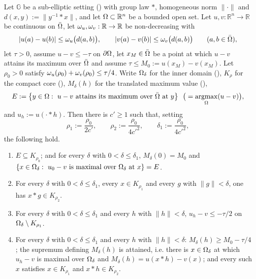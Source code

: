 \begin{lemma}
Let $\mathbb G$ be a sub-elliptic setting () with group law $*$,
homogeneous norm $\|\cdot\|$ and $d(x,y):=\|y^{-1}*x\|$, and let
$\Omega\subset\mathbb R^{n}$ be a bounded open set. Let $u,v:\mathbb R^{n}\to\mathbb R$ be
continuous on $\bar{\Omega}$, let $\omega_u,\omega_v:\mathbb R\to\mathbb R$ be non-decreasing with
\[
 |u(a)-u(b)|\le\omega_u\big(d(a,b)\big),\qquad |v(a)-v(b)|\le\omega_v\big(d(a,b)\big)
 \qquad(a,b\in\bar{\Omega}),
\]
let $\tau>0$, assume $u-v\le-\tau$ on $\partial\Omega$, let $x_M\in\bar{\Omega}$ be a point at which
$u-v$ attains its maximum over $\bar{\Omega}$ and assume $\tau\le M_0:=u(x_M)-v(x_M)$. Let
$\rho_0>0$ satisfy $\omega_u(\rho_0)+\omega_v(\rho_0)\le\tau/4$. Write $\Omega_\delta$ for the inner
domain (), $K_\rho$ for the compact core
(), $M_\delta(h)$ for the translated maximum value
(),
\[
 E:=\big\{y\in\Omega:\ u-v\ \text{attains its maximum over}\ \bar{\Omega}\ \text{at}\ y\big\}
 \ \ \big(=\operatorname*{argmax}_\Omega(u-v)\big),
\]
and $u_h:=u(\cdot*h)$. Then there is $c'\ge1$ such that, setting
\[
 \rho_1:=\frac{\rho_0}{2c'},\qquad \rho_2:=\frac{\rho_0}{4c'^{2}},\qquad
 \delta_1:=\frac{\rho_0}{4c'^{2}},
\]
the following hold.
\begin{enumerate}
\item[(a)] $E\subseteq K_{\rho_0}$; and for every $\delta$ with $0<\delta\le\delta_1$,
  $M_\delta(0)=M_0$ and
  $\{x\in\Omega_\delta:\ u_0-v\ \text{is maximal over}\ \Omega_\delta\ \text{at}\ x\}=E$.
\item[(a$'$)] For every $\delta$ with $0<\delta\le\delta_1$, every $x\in K_{\rho_1}$ and
  every $g$ with $\|g\|<\delta$, one has $x*g\in K_{\rho_2}$.
\item[(b)] For every $\delta$ with $0<\delta\le\delta_1$ and every $h$ with $\|h\|<\delta$,
  $u_h-v\le-\tau/2$ on $\Omega_\delta\setminus K_{\rho_1}$.
\item[(c)] For every $\delta$ with $0<\delta\le\delta_1$ and every $h$ with $\|h\|<\delta$:
  $M_\delta(h)\ge M_0-\tau/4$; the supremum defining $M_\delta(h)$ is attained, i.e. there is
  $x\in\Omega_\delta$ at which $u_h-v$ is maximal over $\Omega_\delta$ and
  $M_\delta(h)=u(x*h)-v(x)$; and every such $x$ satisfies $x\in K_{\rho_1}$ and
  $x*h\in K_{\rho_2}$.
\end{enumerate}
\end{lemma}
